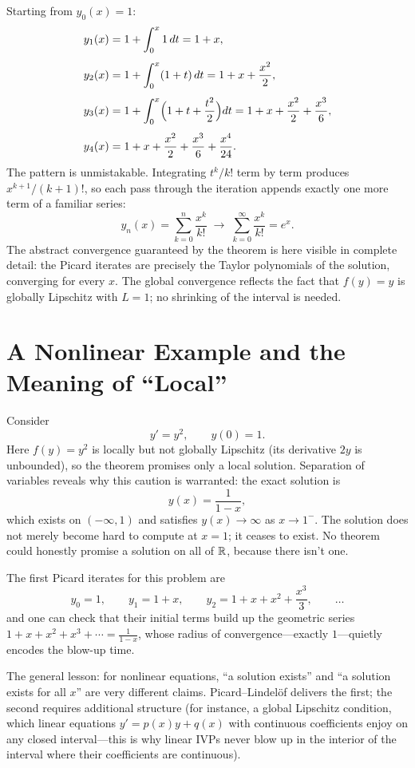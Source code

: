 \documentclass{essay}
\begin{document}
Starting from $y_0(x) = 1$:
\begin{align*}
  y_1(x) &= 1 + \int_0^x 1 \, dt = 1 + x, \\[4pt]
  y_2(x) &= 1 + \int_0^x (1 + t)\, dt = 1 + x + \frac{x^2}{2}, \\[4pt]
  y_3(x) &= 1 + \int_0^x \Bigl( 1 + t + \frac{t^2}{2} \Bigr) dt = 1 + x + \frac{x^2}{2} + \frac{x^3}{6}, \\[4pt]
  y_4(x) &= 1 + x + \frac{x^2}{2} + \frac{x^3}{6} + \frac{x^4}{24}.
\end{align*}
The pattern is unmistakable. Integrating $t^k/k!$ term by term produces $x^{k+1}/(k+1)!$, so each pass through the iteration appends exactly one more term of a familiar series:
\[
  y_n(x) = \sum_{k=0}^{n} \frac{x^k}{k!}
  \;\longrightarrow\;
  \sum_{k=0}^{\infty} \frac{x^k}{k!} = e^x.
\]
The abstract convergence guaranteed by the theorem is here visible in complete detail: the Picard iterates are precisely the Taylor polynomials of the solution, converging for every $x$. The global convergence reflects the fact that $f(y) = y$ is globally Lipschitz with $L = 1$; no shrinking of the interval is needed.

\section{A Nonlinear Example and the Meaning of ``Local''}

\begin{example}
\label{ex:blowup}
Consider
\[
  y' = y^2, \qquad y(0) = 1.
\]
Here $f(y) = y^2$ is locally but not globally Lipschitz (its derivative $2y$ is unbounded), so the theorem promises only a local solution. Separation of variables reveals why this caution is warranted: the exact solution is
\[
  y(x) = \frac{1}{1 - x},
\]
which exists on $(-\infty, 1)$ and satisfies $y(x) \to \infty$ as $x \to 1^{-}$. The solution does not merely become hard to compute at $x = 1$; it ceases to exist. No theorem could honestly promise a solution on all of $\mathbb{R}$, because there isn't one.

The first Picard iterates for this problem are
\[
  y_0 = 1, \qquad
  y_1 = 1 + x, \qquad
  y_2 = 1 + x + x^2 + \frac{x^3}{3}, \qquad \ldots
\]
and one can check that their initial terms build up the geometric series $1 + x + x^2 + x^3 + \cdots = \frac{1}{1-x}$, whose radius of convergence---exactly $1$---quietly encodes the blow-up time.
\end{example}

The general lesson: for nonlinear equations, ``a solution exists'' and ``a solution exists for all $x$'' are very different claims. Picard--Lindel\"of delivers the first; the second requires additional structure (for instance, a global Lipschitz condition, which linear equations $y' = p(x)y + q(x)$ with continuous coefficients enjoy on any closed interval---this is why linear IVPs never blow up in the interior of the interval where their coefficients are continuous).
\end{document}

